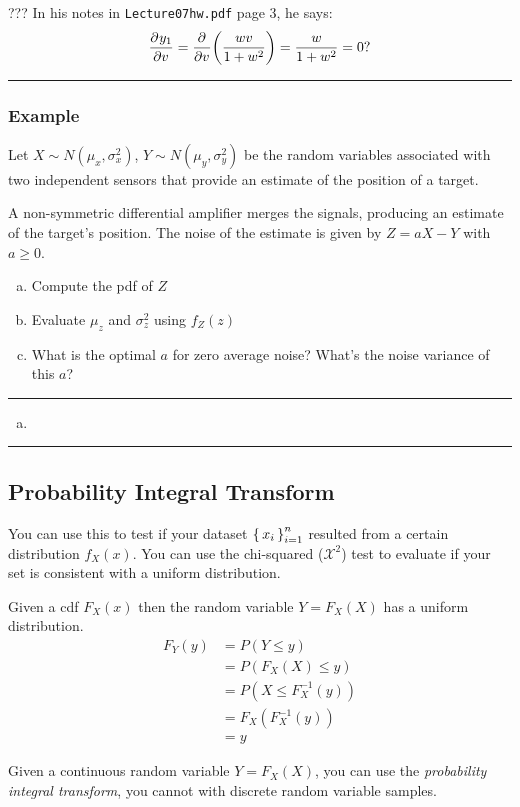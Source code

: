 \documentclass{report}
\newcommand{\var}{\sigma^2}
\newcommand{\ex}{\noindent\rule{\linewidth}{0.2pt}}
\newcommand{\deriv}[3][]{
  \ensuremath{\frac{\partial^{#1} {#2}}{\partial {#3}^{#1}}}}
\DeclarePairedDelimiter\autobracket{(}{)}
\newcommand{\br}[1]{\autobracket*{#1}}
\begin{document}
??? In his notes in \texttt{Lecture07hw.pdf} page 3, he says:  $$
\deriv{y_1}{v} = \deriv{}{v} \br{\frac{wv}{1+w^2}} = \frac{w}{1+w^2} = 0?
$$

\ex
\subsubsection*{Example}

Let $X \sim N(\mu_x, \var_x)$, $Y \sim N(\mu_y, \var_y)$ be the random variables associated with two independent sensors that provide an estimate of the position of a target.

A non-symmetric differential amplifier merges the signals, producing an estimate of the target's position. The noise of the estimate is given by $Z = aX-Y$ with $a \geq 0$. \begin{enumerate}[(a)]
\item Compute the pdf of $Z$
\item Evaluate $\mu_z$ and $\var_z$ using $f_Z(z)$
\item What is the optimal $a$ for zero average noise? What's the noise variance of this $a$?
\end{enumerate}

\ex

\begin{enumerate}[(a)]
\item 
\end{enumerate}

\ex

\subsection{Probability Integral Transform}

You can use this to test if your dataset $\set{x_i}_{i=1}^n$ resulted from a certain distribution $f_X(x)$. You can use the chi-squared ($\mathcal{X}^2$) test to evaluate if your set is consistent with a uniform distribution. 

Given a cdf $F_X(x)$ then the random variable $Y=F_X(X)$ has a uniform distribution. \begin{align*}
F_Y(y) & = P(Y \leq y) \\
& = P(F_X(X) \leq y) \\
& = P(X \leq F_X^{-1}(y)) \\
& = F_X(F^{-1}_X(y)) \\
& = y
\end{align*}

Given a continuous random variable $Y = F_X(X)$, you can use the \textit{probability integral transform}, you cannot with discrete random variable samples.
\end{document}
